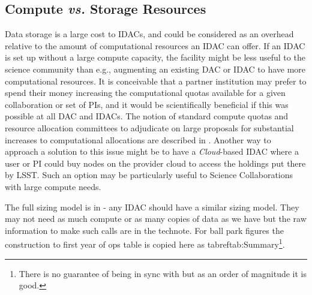 \subsection{Compute {\it vs.} Storage Resources} \label{sec:cvs}
Data storage is a large cost to IDACs, and could be considered as an overhead relative to the amount of computational resources an IDAC can offer. If an IDAC is set up without a large compute capacity, the facility might be less useful to the science community than e.g., augmenting an existing DAC or IDAC to have more computational resources. It is conceivable that a partner institution may prefer to spend their money increasing the computational quotas available for a given collaboration or set of PIs, and it would be scientifically beneficial if this was possible at all DAC and IDACs. The notion of standard compute quotas and resource allocation committees to adjudicate on large proposals for substantial increases to computational allocations are described in . Another way to approach a solution to this issue might be to have a \emph{Cloud}-based IDAC where a user or PI could buy nodes on the provider cloud to access the holdings put there by LSST.  Such an option may be particularly useful to Science Collaborations with large compute needs.

The full sizing model is in  - any IDAC should have a similar sizing model. They may not need as much compute or as many copies of data as we have but the raw information to make such calls are in the technote.  For ball park figures the construction
to first year of ops table is copied here as tabref{tab:Summary}\footnote{ There is no guarantee of being in sync with  but as an order of magnitude it is good.}.


